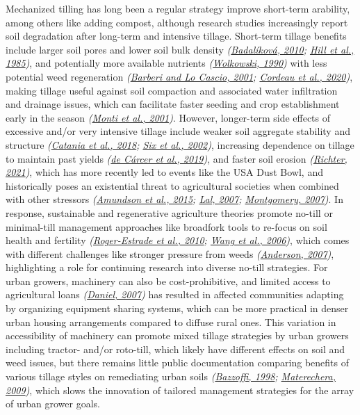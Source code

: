 \documentclass[
  12pt,
]{article}
\begin{document}
Mechanized tilling has long been a regular strategy improve short-term arability, among others like adding compost, although research studies increasingly report soil degradation after long-term and intensive tillage.
Short-term tillage benefits include larger soil pores and lower soil bulk density \emph{(\protect\hyperlink{ref-badalikova10}{Badalíková, 2010}; \protect\hyperlink{ref-hill85}{Hill et al., 1985})}, and potentially more available nutrients \emph{(\protect\hyperlink{ref-wolkowski90}{Wolkowski, 1990})} with less potential weed regeneration \emph{(\protect\hyperlink{ref-barberi01}{Barberi and Lo Cascio, 2001}; \protect\hyperlink{ref-cordeau20}{Cordeau et al., 2020})}, making tillage useful against soil compaction and associated water infiltration and drainage issues, which can facilitate faster seeding and crop establishment early in the season \emph{(\protect\hyperlink{ref-monti01}{Monti et al., 2001})}.
However, longer-term side effects of excessive and/or very intensive tillage include weaker soil aggregate stability and structure \emph{(\protect\hyperlink{ref-catania18}{Catania et al., 2018}; \protect\hyperlink{ref-six02a}{Six et al., 2002})}, increasing dependence on tillage to maintain past yields \emph{(\protect\hyperlink{ref-decarcer19}{de Cárcer et al., 2019})}, and faster soil erosion \emph{(\protect\hyperlink{ref-richter21}{Richter, 2021})}, which has more recently led to events like the USA Dust Bowl, and historically poses an existential threat to agricultural societies when combined with other stressors \emph{(\protect\hyperlink{ref-amundson15}{Amundson et al., 2015}; \protect\hyperlink{ref-lal07}{Lal, 2007}; \protect\hyperlink{ref-montgomery07}{Montgomery, 2007})}.
In response, sustainable and regenerative agriculture theories promote no-till or minimal-till management approaches like broadfork tools to re-focus on soil health and fertility \emph{(\protect\hyperlink{ref-roger-estrade10}{Roger-Estrade et al., 2010}; \protect\hyperlink{ref-wang06}{Wang et al., 2006})}, which comes with different challenges like stronger pressure from weeds \emph{(\protect\hyperlink{ref-anderson07}{Anderson, 2007})}, highlighting a role for continuing research into diverse no-till strategies.
For urban growers, machinery can also be cost-prohibitive, and limited access to agricultural loans \emph{(\protect\hyperlink{ref-daniel07}{Daniel, 2007})} has resulted in affected communities adapting by organizing equipment sharing systems, which can be more practical in denser urban housing arrangements compared to diffuse rural ones.
This variation in accessibility of machinery can promote mixed tillage strategies by urban growers including tractor- and/or roto-till, which likely have different effects on soil and weed issues, but there remains little public documentation comparing benefits of various tillage styles on remediating urban soils \emph{(\protect\hyperlink{ref-bazzoffi98}{Bazzoffi, 1998}; \protect\hyperlink{ref-materechera09}{Materechera, 2009})}, which slows the innovation of tailored management strategies for the array of urban grower goals.
\end{document}
